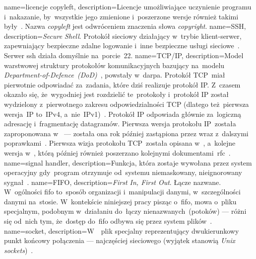 {
	name={licencje copyleft},
	description={Licencje umożliwiające uczynienie programu  i~nakazanie, by~wszystkie jego zmienione i~poszerzone wersje również takimi były~\cite{copyleft,wiki:licenses-comparison}. Nazwa \emph{copyleft} jest odwróceniem znaczenia słowa \emph{copyright}.}
}
{
	name={SSH},
	description={\emph{Secure Shell}. Protokół sieciowy działający w~trybie klient-serwer, zapewniający bezpieczne zdalne logowanie i~inne bezpieczne usługi sieciowe~\cite{rfc:ssh}. Serwer \gls{ssh} działa domyślnie na~porcie~22.}
}
{
	name={TCP/IP},
	description={Model warstwowej struktury protokołów komunikacyjnych bazujący na~modelu \emph{Department-of-Defence~(DoD)}~\cite{rfc:tcpip-dod}, powstały w~\gls{darpa}. Protokół TCP~miał pierwotnie odpowiadać za~zadania, które dziś realizuje protokół IP. Z~czasem okazało się, że~wygodniej jest rozdzielić te~protokoły i~protokół IP został wydzielony z~pierwotnego zakresu odpowiedzialności TCP (dlatego też~pierwsza wersja~IP to~IPv4, a~nie~IPv1)~\cite{tcpguide-tcpip-history}. Protokół IP odpowiada głównie za~logiczną adresację i~fragmentację datagramów. Pierwsza wersja protokołu IP~została zaproponowana w~ --- została ona rok później zastąpiona przez  wraz z~dalszymi poprawkami~\cite{rfc:ip-rfc760,rfc:ip-rfc791}. Pierwsza wizja protokołu TCP~została opisana w~, a~kolejne wersja w~, którą później również poszerzano kolejnymi dokumentami~\gls{rfc}~\cite{rfc:tcp-rfc675,rfc:ip-rfc793}.}
}
{
	name={signal handler},
	description={Funkcja, która zostaje wywołana przez system operacyjny gdy~program otrzymuje od~systemu niemaskowany, nieignorowany sygnał~\cite{signal-handler}.}
}
{
	name={FIFO},
	description={\emph{First In, First Out}. Łącze nazwane. W~ogólności \gls{fifo} to~sposób organizacji i~manipulacji danymi, w~szczególności danymi na~stosie. W~kontekście niniejszej pracy pisząc o~\gls{fifo}, mowa o~pliku specjalnym, podobnym w~działaniu do~łączy nienazwanych~(potoków) --- różni się od~nich tym, że~dostęp do~\gls{fifo} odbywa się przez system plików~\cite{fifo-manual}.}
}
{
	name={socket},
	description={W~~plik specjalny reprezentujący dwukierunkowy punkt końcowy połączenia --- najczęściej sieciowego (wyjątek stanowią \emph{Unix sockets})~\cite{socket-definition-oracle}.}
}
